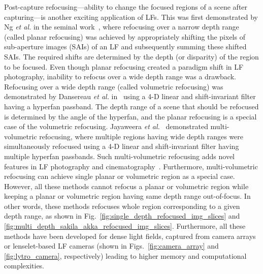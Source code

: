 Post-capture refocusing---ability to change the focused regions of a scene after capturing---is another exciting application of LFs. This was first demonstrated by Ng \textit{et al.} in the seminal work~\cite{ng2005light}, where refocusing over a narrow depth range (called planar refocusing) was achieved by appropriately shifting the pixels of sub-aperture images (SAIs) of an LF and subsequently summing these shifted SAIs. The required shifts are determined by the depth (or disparity) of the region to be focused. Even though planar refocusing created a paradigm shift in LF photography, inability to refocus over a wide depth range was a drawback. Refocusing over a wide depth range (called volumetric refocusing) was demonstrated by Dansereau \textit{et al.} in~\cite{volumetric} using a 4-D linear and shift-invariant filter having a hyperfan passband. The depth range of a scene that should be refocused is determined by the angle of the hyperfan, and the planar refocusing is a special case of the volumetric refocusing. Jayaweera \textit{et al.}~\cite{multivolume} demonstrated multi-volumetric refocusing, where multiple regions having wide depth ranges were simultaneously refocused using a 4-D linear and shift-invariant filter having multiple hyperfan passbands. Such multi-volumetric refocusing adds novel features in LF photography and cinematography~\cite{Tro2019}. Furthermore, multi-volumetric refocusing can achieve single planar or volumetric region as a special case. However, all these methods cannot refocus a planar or volumetric region while keeping a planar or volumetric region having same depth range out-of-focus. In other words, these methods refocuses whole region corresponding to a given depth range, as shown in Fig.~\ref{fig:single_depth_refocused_img_slices} and \ref{fig:multi_depth_sakila_akka_refocused_img_slices}. Furthermore, all these methods have been developed for dense light fields, captured from camera arrays or lenselet-based LF cameras (shown in Figs.~\ref{fig:camera_array} and \ref{fig:lytro_camera}, respectively) leading to higher memory and computational complexities.  

